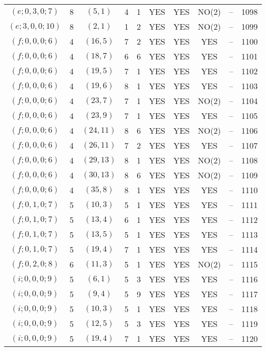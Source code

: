 \begin{longtable}{|c|c|c|c|c|c|c|c|c|c|}
$(e; 0, 3, 0; 7)$ & 8 & $(5, 1)$ & 4 & 1 & YES & YES & NO(2) & -- & 1098\\
$(e; 3, 0, 0; 10)$ & 8 & $(2, 1)$ & 1 & 2 & YES & YES & NO(2) & -- & 1099\\
$(f; 0, 0, 0; 6)$ & 4 & $(16, 5)$ & 7 & 2 & YES & YES & YES & -- & 1100\\
$(f; 0, 0, 0; 6)$ & 4 & $(18, 7)$ & 6 & 6 & YES & YES & YES & -- & 1101\\
$(f; 0, 0, 0; 6)$ & 4 & $(19, 5)$ & 7 & 1 & YES & YES & YES & -- & 1102\\
$(f; 0, 0, 0; 6)$ & 4 & $(19, 6)$ & 8 & 1 & YES & YES & YES & -- & 1103\\
$(f; 0, 0, 0; 6)$ & 4 & $(23, 7)$ & 7 & 1 & YES & YES & NO(2) & -- & 1104\\
$(f; 0, 0, 0; 6)$ & 4 & $(23, 9)$ & 7 & 1 & YES & YES & YES & -- & 1105\\
$(f; 0, 0, 0; 6)$ & 4 & $(24, 11)$ & 8 & 6 & YES & YES & NO(2) & -- & 1106\\
$(f; 0, 0, 0; 6)$ & 4 & $(26, 11)$ & 7 & 2 & YES & YES & YES & -- & 1107\\
$(f; 0, 0, 0; 6)$ & 4 & $(29, 13)$ & 8 & 1 & YES & YES & NO(2) & -- & 1108\\
$(f; 0, 0, 0; 6)$ & 4 & $(30, 13)$ & 8 & 6 & YES & YES & NO(2) & -- & 1109\\
$(f; 0, 0, 0; 6)$ & 4 & $(35, 8)$ & 8 & 1 & YES & YES & YES & -- & 1110\\
$(f; 0, 1, 0; 7)$ & 5 & $(10, 3)$ & 5 & 1 & YES & YES & YES & -- & 1111\\
$(f; 0, 1, 0; 7)$ & 5 & $(13, 4)$ & 6 & 1 & YES & YES & YES & -- & 1112\\
$(f; 0, 1, 0; 7)$ & 5 & $(13, 5)$ & 5 & 1 & YES & YES & YES & -- & 1113\\
$(f; 0, 1, 0; 7)$ & 5 & $(19, 4)$ & 7 & 1 & YES & YES & YES & -- & 1114\\
$(f; 0, 2, 0; 8)$ & 6 & $(11, 3)$ & 5 & 1 & YES & YES & NO(2) & -- & 1115\\
$(i; 0, 0, 0; 9)$ & 5 & $(6, 1)$ & 5 & 3 & YES & YES & YES & -- & 1116\\
$(i; 0, 0, 0; 9)$ & 5 & $(9, 4)$ & 5 & 9 & YES & YES & YES & -- & 1117\\
$(i; 0, 0, 0; 9)$ & 5 & $(10, 3)$ & 5 & 1 & YES & YES & YES & -- & 1118\\
$(i; 0, 0, 0; 9)$ & 5 & $(12, 5)$ & 5 & 3 & YES & YES & YES & -- & 1119\\
$(i; 0, 0, 0; 9)$ & 5 & $(19, 4)$ & 7 & 1 & YES & YES & YES & -- & 1120\\

\end{longtable}

